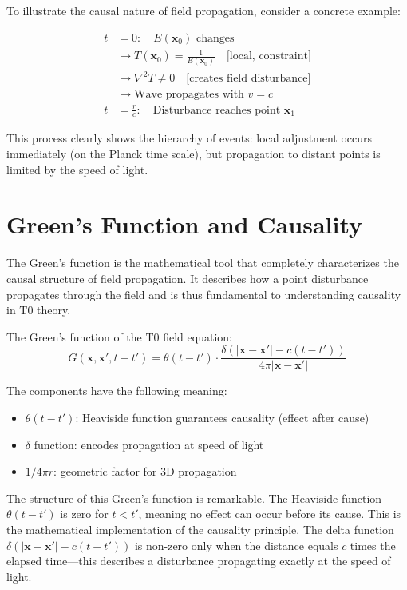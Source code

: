 	To illustrate the causal nature of field propagation, consider a concrete example:
	
	\begin{align}
		t &= 0: \quad E(\mathbf{x}_0) \text{ changes} \\
		&\rightarrow T(\mathbf{x}_0) = \frac{1}{E(\mathbf{x}_0)} \quad \text{[local, constraint]} \\
		&\rightarrow \nabla^2 T \neq 0 \quad \text{[creates field disturbance]} \\
		&\rightarrow \text{Wave propagates with } v = c \\
		t &= \frac{r}{c}: \quad \text{Disturbance reaches point } \mathbf{x}_1
	\end{align}
	
	This process clearly shows the hierarchy of events: local adjustment occurs immediately (on the Planck time scale), but propagation to distant points is limited by the speed of light.
	
	\section{Green's Function and Causality}
	
	The Green's function is the mathematical tool that completely characterizes the causal structure of field propagation. It describes how a point disturbance propagates through the field and is thus fundamental to understanding causality in T0 theory.
	
	The Green's function of the T0 field equation:
	\begin{equation}
		G(\mathbf{x},\mathbf{x}',t-t') = \theta(t-t') \cdot \frac{\delta(|\mathbf{x}-\mathbf{x}'| - c(t-t'))}{4\pi|\mathbf{x}-\mathbf{x}'|} \label{eq:green}
	\end{equation}
	
	The components have the following meaning:
	\begin{itemize}
		\item $\theta(t-t')$: Heaviside function guarantees causality (effect after cause)
		\item $\delta$ function: encodes propagation at speed of light
		\item $1/4\pi r$: geometric factor for 3D propagation
	\end{itemize}
	
	The structure of this Green's function is remarkable. The Heaviside function $\theta(t-t')$ is zero for $t < t'$, meaning no effect can occur before its cause. This is the mathematical implementation of the causality principle. The delta function $\delta(|\mathbf{x}-\mathbf{x}'| - c(t-t'))$ is non-zero only when the distance equals $c$ times the elapsed time—this describes a disturbance propagating exactly at the speed of light.
	
